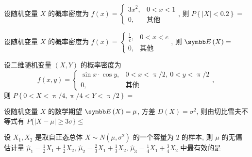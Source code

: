 \begin{ti}
	设随机变量 $X$ 的概率密度为 $f(x)=
	\begin{cases}
	3x^2, & 0<x<1\\
	0, & \text{其他}
	\end{cases}
	$, 则 $P\left\{\left|X\right|<0.2\right\}=$ 
\end{ti}

\begin{ti}
	设随机变量 $X$ 的概率密度为 $f(x)=
	\begin{cases}
	\frac{1}{c}, & 0<x<c\\
	0, & \text{其他}
	\end{cases}
	$, 则 $\EE(X)=$ 
\end{ti}

\begin{ti}
	设二维随机变量 $(X,Y)$ 的概率密度为
	\begin{equation*}
		f(x,y)=
		\begin{cases}
		\sin x\cdot\cos y, & 0<x<\uppi/2,\ 0<y<\uppi/2\\
		0, & \text{其他}
		\end{cases},
	\end{equation*}
	则 $P\left\{0<X<\uppi/4,\uppi/4<Y<\uppi/2\right\}=$ 
\end{ti}

\begin{ti}
	设随机变量 $X$ 的数学期望 $\EE(X)=\mu$, 方差 $D(X)=\sigma^2$, 则由切比雪夫不等式有 $P\{|X-\mu|\geq3\sigma\}\leq$ 
\end{ti}

\begin{ti}
	设 $X_1,X_2$ 是取自正态总体 $X\sim N\left(\mu,\sigma^2\right)$ 的一个容量为 $2$ 的样本, 则 $\mu$ 的无偏估计量 $\hat\mu_1=\frac{1}{2}X_1+\frac{1}{2}X_2$, $\hat\mu_2=\frac{2}{3}X_1+\frac{1}{3}X_2$, $\hat\mu_3=\frac{1}{4}X_1+\frac{3}{4}X_2$ 中最有效的是 
\end{ti}


